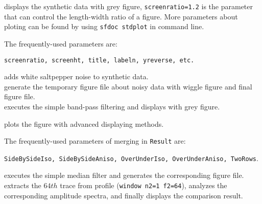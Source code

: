 
%
displays the synthetic data with grey figure, \texttt{screenratio=1.2} is 
the parameter that can control the length-width ratio of a figure. More
parameters about ploting can be found by using \texttt{sfdoc stdplot} in
command line.

The frequently-used parameters are:

\texttt{screenratio, screenht, title, labeln, yreverse, etc.}



%
adds white saltpepper noise to synthetic data. \\


%
generate the temporary figure file about noisy data with wiggle
figure and final figure file.\\


%
executes the simple band-pass filtering and displays with grey figure.\\



%
plots the figure with advanced displaying methods. 

The frequently-used parameters of merging in \texttt{Result} are:

\texttt{SideBySideIso, SideBySideAniso, OverUnderIso, OverUnderAniso, TwoRows}.



%
executes the simple median filter and generates the corresponding
figure file.\\


%
extracts the $64th$ trace from profile (\texttt{window n2=1 f2=64}),
analyzes the corresponding amplitude spectra, and finally displays 
the comparison result.


